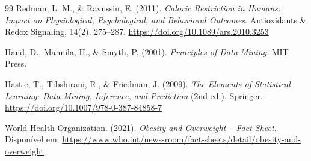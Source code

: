 \begin{thebibliography}{99}
Redman, L. M., \& Ravussin, E. (2011).
\textit{Caloric Restriction in Humans: Impact on Physiological, Psychological, and Behavioral Outcomes}.
Antioxidants \& Redox Signaling, 14(2), 275--287.
\url{https://doi.org/10.1089/ars.2010.3253}

Hand, D., Mannila, H., \& Smyth, P. (2001).
\textit{Principles of Data Mining}.
MIT Press.

Hastie, T., Tibshirani, R., \& Friedman, J. (2009).
\textit{The Elements of Statistical Learning: Data Mining, Inference, and Prediction} (2nd ed.).
Springer.
\url{https://doi.org/10.1007/978-0-387-84858-7}

World Health Organization. (2021).
\textit{Obesity and Overweight -- Fact Sheet}.
Disponível em: \url{https://www.who.int/news-room/fact-sheets/detail/obesity-and-overweight}

\end{thebibliography}



